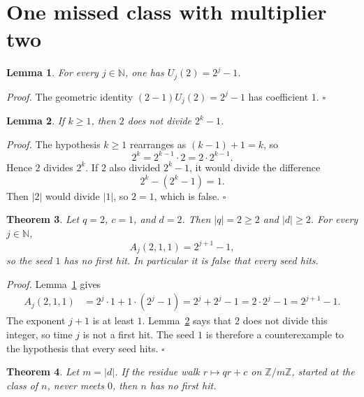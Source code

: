 \documentclass[11pt,letterpaper]{article}
\newcommand{\N}{\mathbb{N}}
\newcommand{\Z}{\mathbb{Z}}
\newtheorem{theorem}{Theorem}
\newtheorem{lemma}[theorem]{Lemma}
\newenvironment{proof}{\noindent\textit{Proof.}}{\hfill\(\square\)}
\begin{document}
\section{One missed class with multiplier two}

\begin{lemma}
\label{lem:trap-two}
For every \(j\in\N\), one has \(U_j(2)=2^j-1\).
\end{lemma}

\begin{proof}
The geometric identity \((2-1)U_j(2)=2^j-1\) has coefficient \(1\).
\end{proof}

\begin{lemma}
\label{lem:two-odd}
If \(k\ge 1\), then \(2\) does not divide \(2^k-1\).
\end{lemma}

\begin{proof}
The hypothesis \(k\ge 1\) rearranges as \((k-1)+1=k\), so
\[
2^k=2^{k-1}\cdot 2=2\cdot 2^{k-1}.
\]
Hence \(2\) divides \(2^k\). If \(2\) also divided \(2^k-1\), it would divide the difference
\[
2^k-(2^k-1)=1.
\]
Then \(\lvert 2\rvert\) would divide \(\lvert 1\rvert\), so \(2=1\), which is false.
\end{proof}

\begin{theorem}
\label{thm:odd-translation}
Let \(q=2\), \(c=1\), and \(d=2\). Then \(\lvert q\rvert=2\ge 2\) and \(\lvert d\rvert\ge 2\). For every \(j\in\N\),
\[
A_j(2,1,1)=2^{j+1}-1,
\]
so the seed \(1\) has no first hit. In particular it is false that every seed hits.
\end{theorem}

\begin{proof}
Lemma~\ref{lem:trap-two} gives
\begin{align*}
A_j(2,1,1)
&=2^j\cdot 1+1\cdot(2^j-1)
=2^j+2^j-1
=2\cdot 2^j-1
=2^{j+1}-1.
\end{align*}
The exponent \(j+1\) is at least \(1\). Lemma~\ref{lem:two-odd} says that \(2\) does not divide this integer, so time \(j\) is not a first hit. The seed \(1\) is therefore a counterexample to the hypothesis that every seed hits.
\end{proof}

\begin{theorem}
\label{thm:classmiss}
Let \(m=\lvert d\rvert\). If the residue walk \(r\mapsto qr+c\) on \(\Z/m\Z\), started at the class of \(n\), never meets \(0\), then \(n\) has no first hit.
\end{theorem}
\end{document}
